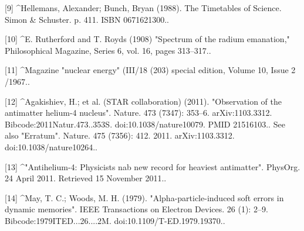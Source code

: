 [9]
^Hellemans, Alexander; Bunch, Bryan (1988). The Timetables of Science. Simon & Schuster. p. 411. ISBN 0671621300..

[10]
^E. Rutherford and T. Royds (1908) "Spectrum of the radium emanation," Philosophical Magazine, Series 6, vol. 16, pages 313–317..

[11]
^Magazine "nuclear energy" (III/18 (203) special edition, Volume 10, Issue 2 /1967..

[12]
^Agakishiev, H.; et al. (STAR collaboration) (2011). "Observation of the antimatter helium-4 nucleus". Nature. 473 (7347): 353–6. arXiv:1103.3312. Bibcode:2011Natur.473..353S. doi:10.1038/nature10079. PMID 21516103.. See also "Erratum". Nature. 475 (7356): 412. 2011. arXiv:1103.3312. doi:10.1038/nature10264..

[13]
^"Antihelium-4: Physicists nab new record for heaviest antimatter". PhysOrg. 24 April 2011. Retrieved 15 November 2011..

[14]
^May, T. C.; Woods, M. H. (1979). "Alpha-particle-induced soft errors in dynamic memories". IEEE Transactions on Electron Devices. 26 (1): 2–9. Bibcode:1979ITED...26....2M. doi:10.1109/T-ED.1979.19370..